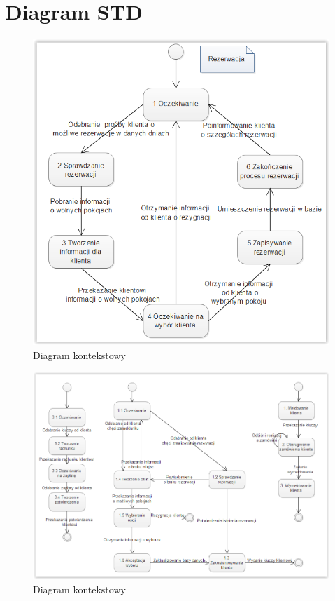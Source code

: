 \documentclass[a4paper, 11pt]{article}
\begin{document}
	\section{Diagram STD}
	\indent
	\begin{figure}[H]%
			\includegraphics[scale=0.8]{Img/STD-rezerwacja.png}
			\caption{Diagram kontekstowy}
	\end{figure}
	
	\indent
	\begin{figure}[H]%
			\includegraphics[scale=0.8]{Img/STD-klient.png}
			\caption{Diagram kontekstowy}
	\end{figure}
	
\end{document}
